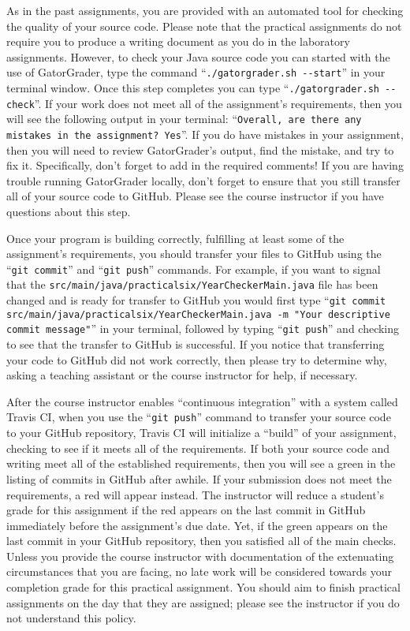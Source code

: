 \documentclass[11pt]{article}
\newcommand{\mainprogramsource}{\lstinline{src/main/java/practicalsix/YearCheckerMain.java}}
\newcommand{\gatorgraderstart}{\command{./gatorgrader.sh --start}}
\newcommand{\gatorgradercheck}{\command{./gatorgrader.sh --check}}
\newcommand{\gitcommit}{\command{git commit}}
\newcommand{\gitpush}{\command{git push}}
\newcommand{\gitcommitmainprogram}{\command{git commit src/main/java/practicalsix/YearCheckerMain.java -m "Your
descriptive commit message"}}
\newcommand{\command}[1]{``\lstinline{#1}''}
\newcommand{\step}[1]{``{#1}''}
\newcommand{\checkmark}{\ding{51}}
\newcommand{\naughtmark}{\ding{55}}
\begin{document}
As in the past assignments, you are provided with an automated tool for checking the quality of your source code. Please
note that the practical assignments do not require you to produce a writing document as you do in the laboratory
assignments. However, to check your Java source code you can started with the use of GatorGrader, type the command
\gatorgraderstart{} in your terminal window. Once this step completes you can type \gatorgradercheck{}. If your work
does not meet all of the assignment's requirements, then you will see the following output in your terminal:
\command{Overall, are there any mistakes in the assignment? Yes}. If you do have mistakes in your assignment, then you
will need to review GatorGrader's output, find the mistake, and try to fix it. Specifically, don't forget to add in the
required comments! If you are having trouble running GatorGrader locally, don't forget to ensure that you still transfer
all of your source code to GitHub. Please see the course instructor if you have questions about this step.

Once your program is building correctly, fulfilling at least some of the assignment's requirements, you should transfer
your files to GitHub using the \gitcommit{} and \gitpush{} commands. For example, if you want to signal that the
\mainprogramsource{} file has been changed and is ready for transfer to GitHub you would first type
\gitcommitmainprogram{} in your terminal, followed by typing \gitpush{} and checking to see that the transfer to GitHub
is successful. If you notice that transferring your code to GitHub did not work correctly, then please try to determine
why, asking a teaching assistant or the course instructor for help, if necessary.

After the course instructor enables \step{continuous integration} with a system called Travis CI, when you use the
\gitpush{} command to transfer your source code to your GitHub repository, Travis CI will initialize a \step{build} of
your assignment, checking to see if it meets all of the requirements. If both your source code and writing meet all of
the established requirements, then you will see a green \checkmark{} in the listing of commits in GitHub after awhile.
If your submission does not meet the requirements, a red \naughtmark{} will appear instead. The instructor will reduce a
student's grade for this assignment if the red \naughtmark{} appears on the last commit in GitHub immediately before the
assignment's due date. Yet, if the green \checkmark{} appears on the last commit in your GitHub repository, then you
satisfied all of the main checks. Unless you provide the course instructor with documentation of the extenuating
circumstances that you are facing, no late work will be considered towards your completion grade for this practical
assignment. You should aim to finish practical assignments on the day that they are assigned; please see the instructor
if you do not understand this policy.
\end{document}
